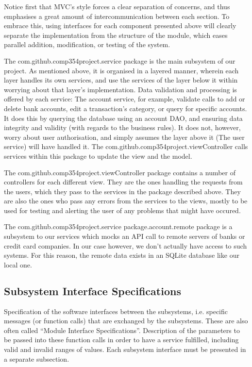 \documentclass[12pt]{article}
\begin{document}
Notice first that MVC's style forces a clear separation of concerns, and thus emphasises a great amount of intercommunication between each section. To embrace this, using interfaces for each component presented above will clearly separate the implementation from the structure of the module, which eases parallel addition, modification, or testing of the system.

The com.github.comp354project.service package is the main subsystem of our project. As mentioned above, it is organised in a layered manner, wherein each layer handles its own services, and use the services of the layer below it within worrying about that layer's implementation. Data validation and processing is offered by each service: The account service, for example, validate calls to add or delete bank accounts, edit a transaction's category, or query for specific accounts. It does this by querying the database using an account DAO, and ensuring data integrity and validity (with regards to the business rules). It does not, however, worry about user authorisation, and simply assumes the layer above it (The user service) will have handled it. The com.github.comp354project.viewController calls services within this package to update the view and the model.

The com.github.comp354project.viewController package contains a number of controllers for each different view. They are the ones handling the requests from the users, which they pass to the services in the package described above. They are also the ones who pass any errors from the services to the views, mostly to be used for testing and alerting the user of any problems that might have occured.

The com.github.comp354project.service package.account.remote package is a subsystem to our services which mocks an API call to remote servers of banks or credit card companies. In our case however, we don't actually have access to such systems. For this reason, the remote data exists in an SQLite database like our local one.

\subsection{Subsystem Interface Specifications} \label{subsystem interface}

Specification of the software interfaces between the subsystems,
i.e. specific messages (or function calls) that are exchanged by the subsystems.
These are also often called ``Module Interface Specifications''.
Description of the parameters to be passed into these function calls in order to have a service fulfilled,
including valid and invalid ranges of values.
Each subsystem interface must be presented in a separate subsection.
\end{document}
